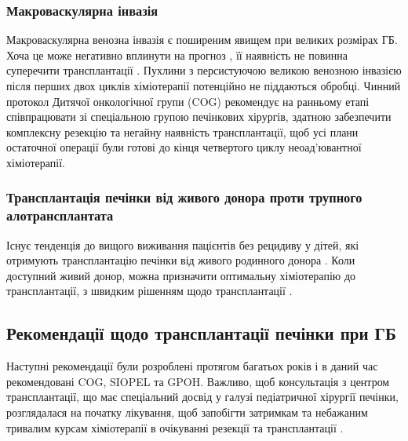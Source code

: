 \subsubsection{Макроваскулярна інвазія} 
Макроваскулярна венозна інвазія є поширеним явищем при великих розмірах ГБ. Хоча це може негативно вплинути на прогноз \cite{pmid12352881}, її наявність не повинна суперечити трансплантації \cite{pmid20406943}. Пухлини з персистуючою великою венозною інвазією після перших двох циклів хіміотерапії потенційно не піддаються обробці. Чинний протокол Дитячої онкологічної групи (COG) рекомендує на ранньому етапі співпрацювати зі спеціальною групою печінкових хірургів, здатною забезпечити комплексну резекцію та негайну наявність трансплантації, щоб усі плани остаточної операції були готові до кінця четвертого циклу неоад'ювантної хіміотерапії.

\subsubsection{Трансплантація печінки від живого донора проти трупного алотрансплантата} 
Існує тенденція до вищого виживання пацієнтів без рецидиву у дітей, які отримують трансплантацію печінки від живого родинного донора \cite{pmid31155201}. Коли доступний живий донор, можна призначити оптимальну хіміотерапію до трансплантації, з швидким рішенням щодо трансплантації \cite{pmid10839879}.

\subsection{Рекомендації щодо трансплантації печінки при ГБ}
Наступні рекомендації були розроблені протягом багатьох років і в даний час рекомендовані COG, SIOPEL та GPOH. Важливо, щоб консультація з центром трансплантації, що має спеціальний досвід у галузі педіатричної хірургії печінки, розглядалася на початку лікування, щоб запобігти затримкам та небажаним тривалим курсам хіміотерапії в очікуванні резекції та трансплантації \cite{Chen2019}.


